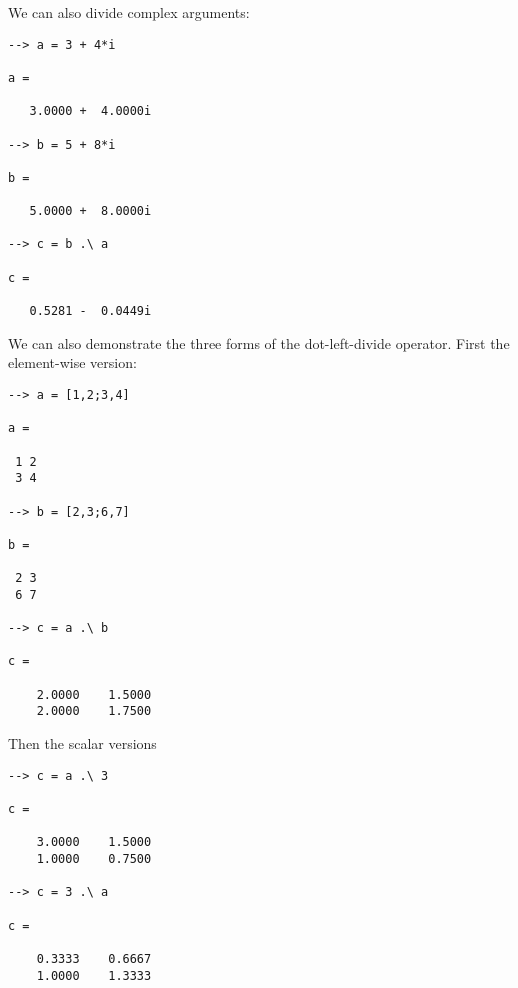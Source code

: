 We can also divide complex arguments:
\begin{verbatim}
--> a = 3 + 4*i

a = 

   3.0000 +  4.0000i 

--> b = 5 + 8*i

b = 

   5.0000 +  8.0000i 

--> c = b .\ a

c = 

   0.5281 -  0.0449i 
\end{verbatim}
We can also demonstrate the three forms of the dot-left-divide operator.  First
the element-wise version:
\begin{verbatim}
--> a = [1,2;3,4]

a = 

 1 2 
 3 4 

--> b = [2,3;6,7]

b = 

 2 3 
 6 7 

--> c = a .\ b

c = 

    2.0000    1.5000 
    2.0000    1.7500 
\end{verbatim}
Then the scalar versions
\begin{verbatim}
--> c = a .\ 3

c = 

    3.0000    1.5000 
    1.0000    0.7500 

--> c = 3 .\ a

c = 

    0.3333    0.6667 
    1.0000    1.3333 
\end{verbatim}
